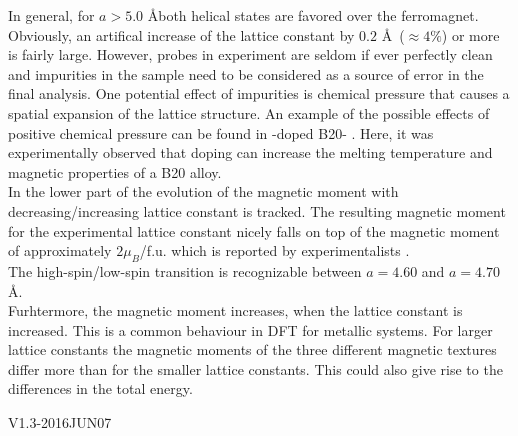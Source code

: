 \documentclass [a4paper, 12pt]{article}
\begin{document}
In general, for $a>5.0$ \AA both helical states are favored over the ferromagnet.
\\
Obviously, an artifical increase of the lattice constant by
$0.2$ \AA \, ($\approx 4 \%$) or more is fairly large.
However, probes in experiment are seldom if ever perfectly clean and
impurities in the sample need to be considered as a source of error in the
final analysis. One potential
effect of impurities is chemical pressure that causes a spatial expansion of the
lattice structure.
An example of the possible effects of positive chemical pressure
can be found in -doped B20- \cite{stolt_chemical_2018}. 
Here, it was experimentally observed
that doping can increase the melting temperature and magnetic properties of a B20 alloy.
\\
In the lower part of  the evolution of the magnetic moment
with decreasing/increasing lattice constant is tracked.
The resulting magnetic moment for the experimental lattice constant nicely falls 
on top of the magnetic moment of approximately $2 \mu_{B}$/f.u. 
which is reported by experimentalists \cite{yaouanc_magnetic_2017}.
\\
The high-spin/low-spin transition is recognizable between $a=4.60$ and $a=4.70$ \AA.
\\
Furhtermore, the magnetic moment increases, when the lattice constant is increased.
This is a common behaviour in DFT for metallic systems.
For larger lattice constants the magnetic moments of the three different
magnetic textures differ more than for the smaller lattice constants.
This could also give rise to the differences in the total energy.



\newpage




\bigskip
\begin{flushright}
{\tiny V1.3-2016JUN07}
\end{flushright}
\end{document}
